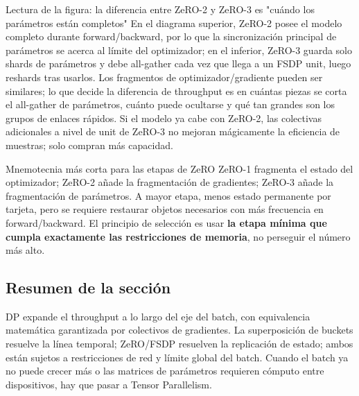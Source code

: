 \documentclass[a4paper]{article}
\begin{document}
\begin{knowledgebox}{Lectura de la figura: la diferencia entre ZeRO-2 y ZeRO-3 es "cuándo los parámetros están completos"}
En el diagrama superior, ZeRO-2 posee el modelo completo durante forward/backward, por lo que la sincronización principal de parámetros se acerca al límite del optimizador; en el inferior, ZeRO-3 guarda solo shards de parámetros y debe all-gather cada vez que llega a un FSDP unit, luego reshards tras usarlos. Los fragmentos de optimizador/gradiente pueden ser similares; lo que decide la diferencia de throughput es en cuántas piezas se corta el all-gather de parámetros, cuánto puede ocultarse y qué tan grandes son los grupos de enlaces rápidos. Si el modelo ya cabe con ZeRO-2, las colectivas adicionales a nivel de unit de ZeRO-3 no mejoran mágicamente la eficiencia de muestras; solo compran más capacidad.
\end{knowledgebox}


\begin{importantbox}{Mnemotecnia más corta para las etapas de ZeRO}
ZeRO-1 fragmenta el estado del optimizador; ZeRO-2 añade la fragmentación de gradientes; ZeRO-3 añade la fragmentación de parámetros. A mayor etapa, menos estado permanente por tarjeta, pero se requiere restaurar objetos necesarios con más frecuencia en forward/backward. El principio de selección es usar \textbf{la etapa mínima que cumpla exactamente las restricciones de memoria}, no perseguir el número más alto.
\end{importantbox}

\subsection{Resumen de la sección}

DP expande el throughput a lo largo del eje del batch, con equivalencia matemática garantizada por colectivos de gradientes. La superposición de buckets resuelve la línea temporal; ZeRO/FSDP resuelven la replicación de estado; ambos están sujetos a restricciones de red y límite global del batch. Cuando el batch ya no puede crecer más o las matrices de parámetros requieren cómputo entre dispositivos, hay que pasar a Tensor Parallelism.
\end{document}
